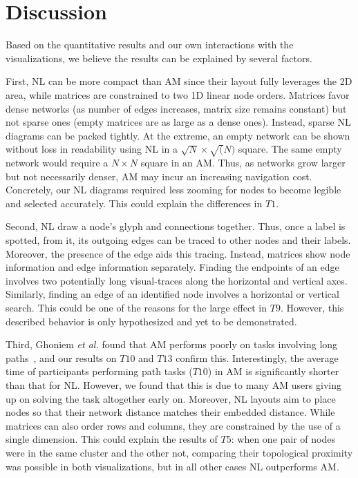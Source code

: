 \section{Discussion}

Based on the quantitative results and our own interactions with the visualizations, we believe the results can be explained by several factors.

First, NL can be more compact than AM since their layout fully leverages the 2D area, while matrices are constrained to two 1D linear node orders. Matrices favor dense networks (as number of edges increases, matrix size remains constant) but not sparse ones (empty matrices are as large as a dense ones). Instead, sparse NL diagrams can be packed tightly. At the extreme, an empty network can be shown without loss in readability using NL in a $\sqrt{N}\times\sqrt(N)$ square. The same empty network would require a $N \times N$ square in an AM.
Thus, as networks grow larger but not necessarily denser, AM may incur an increasing navigation cost. Concretely, our NL diagrams required less zooming for nodes to become legible and selected accurately. This could explain the differences in $T1$.


Second, NL draw a node's glyph and connections together. Thus, once a label is spotted, from it, its outgoing edges can be traced to other nodes and their labels. Moreover, the presence of the edge aids this tracing.  Instead, matrices show node information and edge information separately. Finding the endpoints of an edge involves two potentially long visual-traces along the horizontal and vertical axes. Similarly, finding an edge of an identified node involves a horizontal or vertical search. This could be one of the reasons for the large effect in $T9$. However,  this described behavior is only hypothesized and yet to be demonstrated.

Third,  Ghoniem {\it et al.} found that AM performs poorly on tasks involving long paths~\cite{ghoniem2004comparison}, and our results on $T10$ and $T13$ confirm this. Interestingly, the average time of participants performing path tasks ($T10$) in AM is significantly shorter than that for NL. However, we found that this is due to many AM users giving up on solving the task altogether early on. Moreover, NL layouts aim to place nodes so that their network distance matches their embedded distance. While matrices can also order rows and columns, they are constrained by the use of a single dimension. This could explain the results of $T5$: when one pair of nodes were in the same cluster and the other not, comparing their topological proximity was possible in both visualizations, but in all other cases NL outperforms AM.

